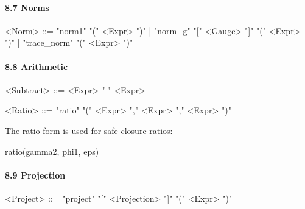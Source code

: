 \documentclass[
]{article}
\newenvironment{Shaded}{\begin{snugshade}}{\end{snugshade}}
\newcommand{\NormalTok}[1]{\textcolor[rgb]{0.12,0.11,0.11}{#1}}
\begin{document}
\paragraph{8.7 Norms}\label{norms}

\begin{Shaded}
\begin{Highlighting}[]
\NormalTok{\textless{}Norm\textgreater{} ::=}
\NormalTok{    "norm1" "(" \textless{}Expr\textgreater{} ")"}
\NormalTok{  | "norm\_g" "[" \textless{}Gauge\textgreater{} "]" "(" \textless{}Expr\textgreater{} ")"}
\NormalTok{  | "trace\_norm" "(" \textless{}Expr\textgreater{} ")"}
\end{Highlighting}
\end{Shaded}

\paragraph{8.8 Arithmetic}\label{arithmetic}

\begin{Shaded}
\begin{Highlighting}[]
\NormalTok{\textless{}Subtract\textgreater{} ::= \textless{}Expr\textgreater{} "{-}" \textless{}Expr\textgreater{}}

\NormalTok{\textless{}Ratio\textgreater{} ::= "ratio" "(" \textless{}Expr\textgreater{} "," \textless{}Expr\textgreater{} "," \textless{}Expr\textgreater{} ")"}
\end{Highlighting}
\end{Shaded}

The ratio form is used for safe closure ratios:

\begin{Shaded}
\begin{Highlighting}[]
\NormalTok{ratio(gamma2, phi1, eps)}
\end{Highlighting}
\end{Shaded}

\paragraph{8.9 Projection}\label{projection}

\begin{Shaded}
\begin{Highlighting}[]
\NormalTok{\textless{}Project\textgreater{} ::= "project" "[" \textless{}Projection\textgreater{} "]" "(" \textless{}Expr\textgreater{} ")"}
\end{Highlighting}
\end{Shaded}
\end{document}
